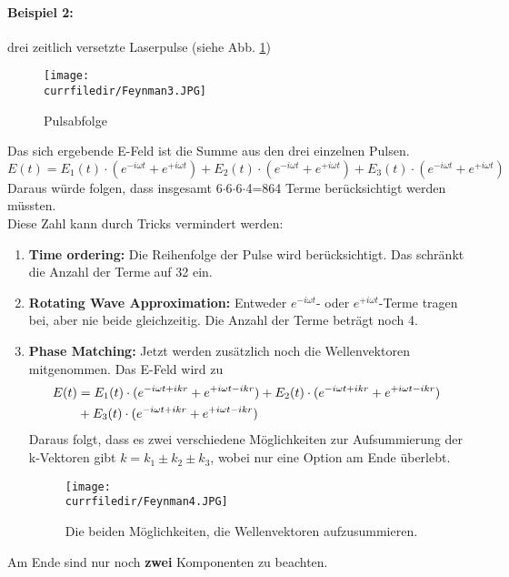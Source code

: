 \paragraph{Beispiel 2:} drei zeitlich versetzte Laserpulse (siehe Abb. \ref{fig:Feynman3})

\begin{figure} [h!]
    \centering
    \texttt{[image: \\currfiledir/Feynman3.JPG]}
    \caption{Pulsabfolge}
    \label{fig:Feynman3}
\end{figure}

Das sich ergebende E-Feld ist die Summe aus den drei einzelnen Pulsen.
\begin{equation}
    E(t) = E_1(t)\cdot(e^{-i\omega t} + e^{+i\omega t}) + E_2(t)\cdot(e^{-i\omega t} + e^{+i\omega t}) + E_3(t)\cdot(e^{-i\omega t} + e^{+i\omega t})
\end{equation}
Daraus würde folgen, dass insgesamt 6$\cdot$6$\cdot$6$\cdot$4=864 Terme berücksichtigt werden müssten.\\
Diese Zahl kann durch Tricks vermindert werden:
\begin{enumerate}
    \item \textbf{Time ordering:} Die Reihenfolge der Pulse wird berücksichtigt. Das schränkt die Anzahl der Terme auf 32 ein.
    \item \textbf{Rotating Wave Approximation:} Entweder $e^{-i\omega t}$- oder $e^{+i\omega t}$-Terme tragen bei, aber nie beide gleichzeitig. Die Anzahl der Terme beträgt noch 4.
    \item \textbf{Phase Matching:} Jetzt werden zusätzlich noch die Wellenvektoren mitgenommen. Das E-Feld wird zu
    \begin{align}
    E(t) &= E_1(t)\cdot(e^{-i\omega t+ikr} + e^{+i\omega t-ikr}) + E_2(t)\cdot(e^{-i\omega t+ikr} + e^{+i\omega t-ikr}) \notag\\ &+ E_3(t)\cdot(e^{-i\omega t+ikr} + e^{+i\omega t-ikr})
     \end{align}
     Daraus folgt, dass es zwei verschiedene Möglichkeiten zur Aufsummierung der k-Vektoren gibt $k = k_1 \pm k_2 \pm k_3$, wobei nur eine Option am Ende überlebt.
     \begin{figure} [h]
    \centering
    \texttt{[image: \\currfiledir/Feynman4.JPG]}
    \caption{Die beiden Möglichkeiten, die Wellenvektoren aufzusummieren.}
    \label{fig:Feynman4}
\end{figure}
\end{enumerate}
Am Ende sind nur noch \textbf{zwei} Komponenten zu beachten.


